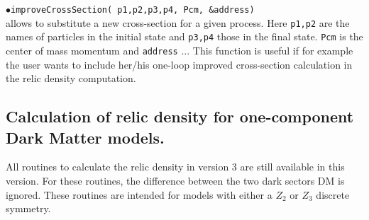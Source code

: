 \documentclass[12pt,a4paper]{article}
\begin{document}
\noindent$\bullet$\verb|improveCrossSection( p1,p2,p3,p4, Pcm, &address)|\\
allows to substitute a new cross-section for a given process. Here \verb|p1,p2| are the names of particles in the initial state and \verb|p3,p4| those in the final state. \verb|Pcm| is the center of mass momentum and \verb|address| ... This function is useful if for example the user wants to include her/his one-loop improved cross-section calculation in the relic density computation.


\subsection{Calculation of relic density for one-component Dark Matter models.}
\label{sec:one_component}
All routines to calculate the relic density in  version 3 are still available in this version. For these routines,  the difference between 
the two dark sectors DM is ignored. These routines are intended for models with either a $Z_2$ or $Z_3$ discrete symmetry.
  
\end{document}

